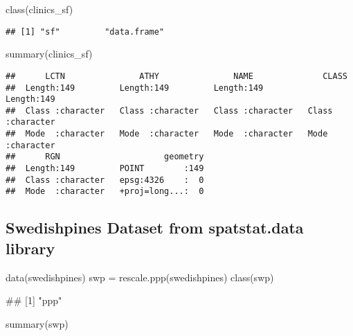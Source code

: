 \documentclass[
]{book}
\newenvironment{Shaded}{\begin{snugshade}}{\end{snugshade}}
\newcommand{\FunctionTok}[1]{\textcolor[rgb]{0.00,0.00,0.00}{#1}}
\newcommand{\NormalTok}[1]{#1}
\newcommand{\OtherTok}[1]{\textcolor[rgb]{0.56,0.35,0.01}{#1}}
\begin{document}
\begin{Shaded}
\begin{Highlighting}[]
\FunctionTok{class}\NormalTok{(clinics\_sf)}
\end{Highlighting}
\end{Shaded}

\begin{verbatim}
## [1] "sf"         "data.frame"
\end{verbatim}

\begin{Shaded}
\begin{Highlighting}[]
\FunctionTok{summary}\NormalTok{(clinics\_sf)}
\end{Highlighting}
\end{Shaded}

\begin{verbatim}
##      LCTN               ATHY               NAME              CLASS          
##  Length:149         Length:149         Length:149         Length:149        
##  Class :character   Class :character   Class :character   Class :character  
##  Mode  :character   Mode  :character   Mode  :character   Mode  :character  
##      RGN                     geometry  
##  Length:149         POINT        :149  
##  Class :character   epsg:4326    :  0  
##  Mode  :character   +proj=long...:  0
\end{verbatim}

\hypertarget{swedishpines-dataset-from-spatstat.data-library-1}{%
\subsection{Swedishpines Dataset from spatstat.data library}\label{swedishpines-dataset-from-spatstat.data-library-1}}

\begin{Shaded}
\begin{Highlighting}[]
\FunctionTok{data}\NormalTok{(swedishpines)}
\NormalTok{swp }\OtherTok{=} \FunctionTok{rescale.ppp}\NormalTok{(swedishpines)}
\FunctionTok{class}\NormalTok{(swp)}
\end{Highlighting}
\end{Shaded}

\begin{Shaded}
\begin{Highlighting}[]
\NormalTok{\#\# [1] "ppp"}
\end{Highlighting}
\end{Shaded}

\begin{Shaded}
\begin{Highlighting}[]
\FunctionTok{summary}\NormalTok{(swp)}
\end{Highlighting}
\end{Shaded}
\end{document}
